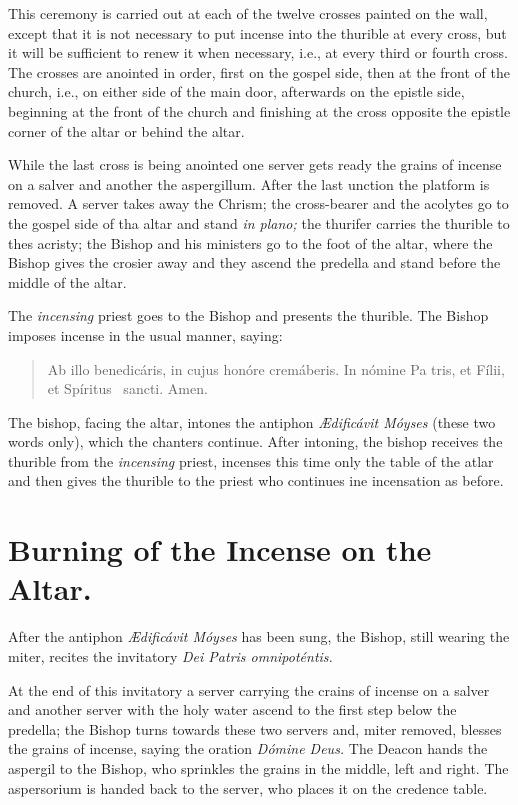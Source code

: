 \documentclass[letterpaper]{report}
\newcommand\blessincense{
\begin{quote}
   Ab illo benedicáris, in cujus honóre cremáberis. In nómine Pa\cross
    tris, et Fí\cross lii, et Spíritus \cross\ sancti. \rbar Amen.
\end{quote}
}
\begin{document}
{\rubric This ceremony is carried out at each of the twelve crosses painted on
the wall, except that it is not necessary to put incense into the thurible at
every cross, but it will be sufficient to renew it when necessary, i.e., at
every third or fourth cross. The crosses are anointed in order, first on the
gospel side, then at the front of the church, i.e., on either side of the main
door, afterwards on the epistle side, beginning at the front of the church and
finishing at the cross opposite the epistle corner of the altar or behind the
altar.

\rubric While the last cross is being anointed one server gets ready the
grains of incense on a salver and another the aspergillum. After the last
unction the platform is removed. A server takes away the Chrism; the
cross-bearer and the acolytes go to the gospel side of tha altar and stand
\textit{in plano;} the thurifer carries the thurible to thes acristy; the
Bishop and his ministers go to the foot of the altar, where the Bishop gives
the crosier away and they ascend the predella and stand before the middle of
the altar.

\rubric The \textit{incensing} priest goes to the Bishop and presents the
thurible. The Bishop imposes incense in the usual manner, saying:

\blessincense

The bishop, facing the altar, intones the antiphon \textit{\AE dificávit
Móyses} (these two words only), which the chanters continue. After intoning,
the bishop receives the thurible from the \textit{incensing} priest, incenses
this time only the table of the atlar and then gives the thurible to the priest
who continues ine incensation as before.

\section{Burning of the Incense on the Altar.}

\rubric After the antiphon \textit{\AE dificávit Móyses} has been sung, the
Bishop, still wearing the miter, recites the invitatory \textit{Dei Patris
omnipoténtis.}

\rubric At the end of this invitatory a server carrying the crains of incense
on a salver and another server with the holy water ascend to the first step
below the predella; the Bishop turns towards these two servers and, miter
removed, blesses the grains of incense, saying the oration \textit{Dómine
Deus.} The Deacon hands the aspergil to the Bishop, who sprinkles the grains in
the middle, left and right. The aspersorium is handed back to the server, who
places it on the credence table.

}
\end{document}
